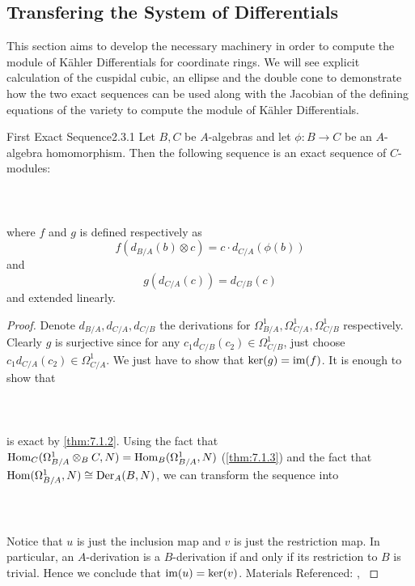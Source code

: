\documentclass[a4paper]{article}
\begin{document}
\subsection{Transfering the System of Differentials}
This section aims to develop the necessary machinery in order to compute the module of Kähler Differentials for coordinate rings. We will see explicit calculation of the cuspidal cubic, an ellipse and the double cone to demonstrate how the two exact sequences can be used along with the Jacobian of the defining equations of the variety to compute the module of Kähler Differentials. 

\begin{thm}{First Exact Sequence}{2.3.1} Let $B,C$ be $A$-algebras and let $\phi:B\to C$ be an $A$-algebra homomorphism. Then the following sequence is an exact sequence of $C$-modules: \\~\\
 \\~\\
where $f$ and $g$ is defined respectively as $$f(d_{B/A}(b)\otimes c)=c\cdot d_{C/A}(\phi(b))$$ and $$g(d_{C/A}(c))=d_{C/B}(c)$$ and extended linearly. \tcbline
\begin{proof}
Denote $d_{B/A},d_{C/A},d_{C/B}$ the derivations for $\Omega_{B/A}^1,\Omega_{C/A}^1,\Omega_{C/B}^1$ respectively. Clearly $g$ is surjective since for any $c_1d_{C/B}(c_2)\in\Omega_{C/B}^1$, just choose $c_1d_{C/A}(c_2)\in\Omega_{C/A}^1$. We just have to show that $\ker(g)=\operatorname{im}(f)$. It is enough to show that \\~\\
\\~\\
is exact by \ref{thm:7.1.2}. Using the fact that $\operatorname{Hom}_C(\Omega_{B/A}^1\otimes_BC,N)=\operatorname{Hom}_B(\Omega_{B/A}^1,N)$ (\ref{thm:7.1.3}) and the fact that $\operatorname{Hom}(\Omega_{B/A}^1,N)\cong\text{Der}_A(B,N)$, we can transform the sequence into \\~\\
\\~\\
Notice that $u$ is just the inclusion map and $v$ is just the restriction map. In particular, an $A$-derivation is a $B$-derivation if and only if its restriction to $B$ is trivial. Hence we conclude that $\operatorname{im}(u)=\ker(v)$. 
Materials Referenced: \cite{Liu}, \cite{CRing}
\end{proof}
\end{thm}
\end{document}
